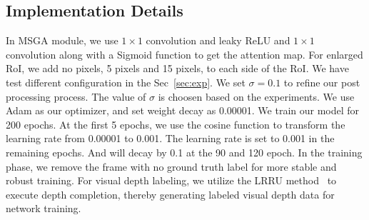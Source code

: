 \documentclass[journal]{IEEEtran}
\begin{document}
	
	\subsection{Implementation Details}\label{imple}
	In MSGA module, we use $1\times 1$ convolution and leaky ReLU and $1\times 1$ convolution along with a Sigmoid function to get the attention map. For enlarged RoI, we add no pixels, 5 pixels and 15 pixels, to each side of the RoI. We have test different configuration in the Sec~\ref{sec:exp}. We set $\sigma=0.1$ to refine our post processing process. The value of $\sigma$ is choosen based on the experiments. We use Adam as our optimizer, and set weight decay as 0.00001. We train our model for 200 epochs. At the first 5 epochs, we use the cosine function to transform the learning rate from 0.00001 to 0.001. The learning rate is set to 0.001 in the remaining epochs. And will decay by 0.1 at the 90 and 120 epoch. In the training phase, we remove the frame with no ground truth label for more stable and robust training. For visual depth labeling, we utilize the LRRU method~\cite{lrru} to execute depth completion, thereby generating labeled visual depth data for network training.
	
\end{document}
